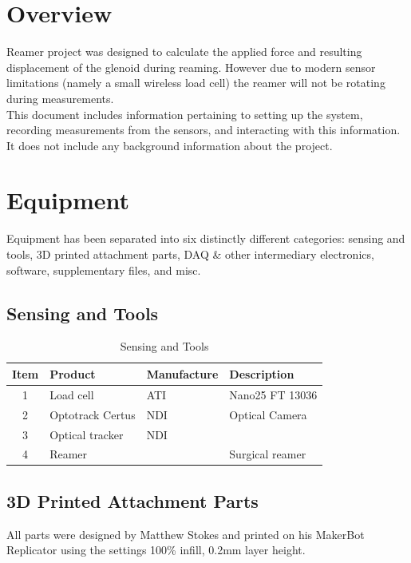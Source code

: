 \documentclass[pdftex,11pt,letterpaper]{article}
\begin{document}

\pagebreak
\tableofcontents
\thispagestyle{fancy}
\pagebreak
\listoffigures
\thispagestyle{fancy}
\pagebreak
\listoftables
\thispagestyle{fancy}
\pagebreak


\section{Overview} 
Reamer project was designed to calculate the applied force and resulting displacement of the glenoid during reaming. However due to modern sensor limitations (namely a small wireless load cell) the reamer will not be rotating during measurements. \\

This document includes information pertaining to setting up the system, recording measurements from the sensors, and interacting with this information. It does not include any background information about the project.

\section{Equipment}
Equipment has been separated into six distinctly different categories: sensing and tools, 3D printed attachment parts, DAQ \& other intermediary electronics, software, supplementary files, and misc. 


\subsection{Sensing and Tools}

\begin{table}[h!]
\begin{center}
    \begin{tabular}{ | c | l | l | l |}
    \hline
    Item & Product & Manufacture & Description \\ \hline
    1 & Load cell & ATI & Nano25 FT 13036 \\ \hline  
    2 & Optotrack Certus & NDI & Optical Camera \\ \hline
    3 & Optical tracker & NDI & \\ \hline
    4 & Reamer & & Surgical reamer \\ \hline
    \end{tabular}
    \caption{Sensing and Tools}
\end{center}
\end{table}

\subsection{3D Printed Attachment Parts}
All parts were designed by Matthew Stokes and printed on his MakerBot Replicator using the settings 100\% infill, 0.2mm layer height. 
\end{document}
